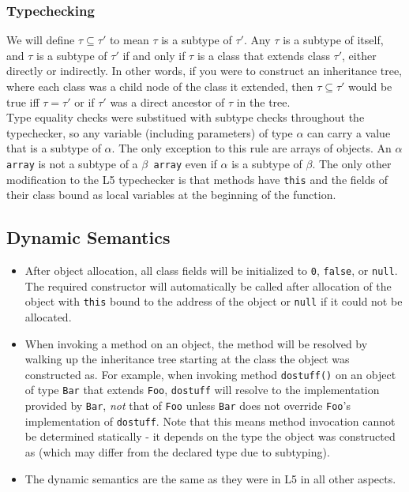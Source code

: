 \documentclass{article}
\begin{document}
\subsubsection{Typechecking}
We will define $\tau \subseteq \tau'$ to mean $\tau$ is a subtype of $\tau'$.
Any $\tau$ is a subtype of itself, and $\tau$ is a subtype of $\tau'$ if and only
if $\tau$ is a class that extends class $\tau'$, either directly or indirectly.
In other words, if you were to construct an inheritance tree, where each class
was a child node of the class it extended, then $\tau \subseteq \tau'$ would be
true iff $\tau = \tau'$ or if $\tau'$ was a direct ancestor of $\tau$ in the
tree. \\

Type equality checks were substitued with subtype checks throughout the
typechecker, so any variable (including parameters) of type $\alpha$ can carry
a value that is a subtype of $\alpha$. The only exception to this
rule are arrays of objects. An \texttt{$\alpha$ array} is not a subtype of a
\texttt{$\beta$ array} even if \texttt{$\alpha$} is a subtype of
\texttt{$\beta$}. The only other modification to the L5 typechecker is that
methods have \texttt{this} and the fields of their class bound as local
variables at the beginning of the function.

\subsection{Dynamic Semantics}
\begin{itemize}
\item After object allocation, all class fields will be initialized to \texttt{0},
      \texttt{false}, or \texttt{null}. The required constructor will
      automatically be called after allocation of the object with \texttt{this}
      bound to the address of the object or \texttt{null} if it could not be
      allocated.
\item When invoking a method on an object, the method will be resolved by
      walking up the inheritance tree starting at the class the object was
      constructed as. For example, when invoking
      method \texttt{dostuff()} on an object of type \texttt{Bar} that extends
      \texttt{Foo}, \texttt{dostuff} will resolve to the implementation provided
      by \texttt{Bar}, \emph{not} that of \texttt{Foo} unless \texttt{Bar} does
      not override \texttt{Foo}'s implementation of \texttt{dostuff}. Note that
      this means method invocation cannot be determined statically - it depends
      on the type the object was constructed as (which may differ from the
      declared type due to subtyping).
\item The dynamic semantics are the same as they were in L5 in all other
      aspects.
\end{itemize}
\end{document}
